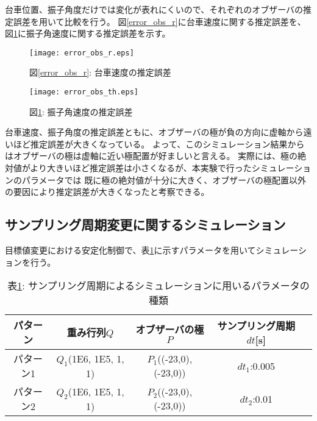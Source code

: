 台車位置、振子角度だけでは変化が表れにくいので、それぞれのオブザーバの推定誤差を用いて比較を行う。
図\ref{error_obs_r}に台車速度に関する推定誤差を、図\ref{error_obs_th}に振子角速度に関する推定誤差を示す。

\begin{figure}[htbp]
    \begin{minipage}{0.5\hsize}
        \begin{center}
            \texttt{[image: error\_obs\_r.eps]}
            \caption{図\ref{error_obs_r}: 台車速度の推定誤差}
            \label{error_obs_r}
        \end{center}
    \end{minipage}
    \begin{minipage}{0.5\hsize}
        \begin{center}
            \texttt{[image: error\_obs\_th.eps]}
            \caption{図\ref{error_obs_th}: 振子角速度の推定誤差}
            \label{error_obs_th}
        \end{center}
    \end{minipage}
\end{figure}

台車速度、振子角度の推定誤差ともに、オブザーバの極が負の方向に虚軸から遠いほど推定誤差が大きくなっている。
よって、このシミュレーション結果からはオブザーバの極は虚軸に近い極配置が好ましいと言える。
実際には、極の絶対値がより大きいほど推定誤差は小さくなるが、本実験で行ったシミュレーションのパラメータでは
既に極の絶対値が十分に大きく、オブザーバの極配置以外の要因により推定誤差が大きくなったと考察できる。


\subsection{サンプリング周期変更に関するシミュレーション}
目標値変更における安定化制御で、表\ref{sim_Dt}に示すパラメータを用いてシミュレーションを行う。

\begin{table}[htbp]
    \begin{center}
        \caption{表\ref{sim_Dt}: サンプリング周期によるシミュレーションに用いるパラメータの種類}
        \begin{tabular}{|c|c|c|c|c|} \hline
            パターン & 重み行列$Q$ & オブザーバの極$P$ & サンプリング周期$dt$[s] \\ \hline \hline
            パターン1 & $Q_1$(1E6, 1E5, 1, 1) & $P_1$((-23,0), (-23,0)) & $dt_1$:0.005 \\ \hline
            パターン2 & $Q_2$(1E6, 1E5, 1, 1) & $P_2$((-23,0), (-23,0)) & $dt_2$:0.01 \\ \hline
        \end{tabular}
        \label{sim_Dt}
    \end{center}
\end{table}

